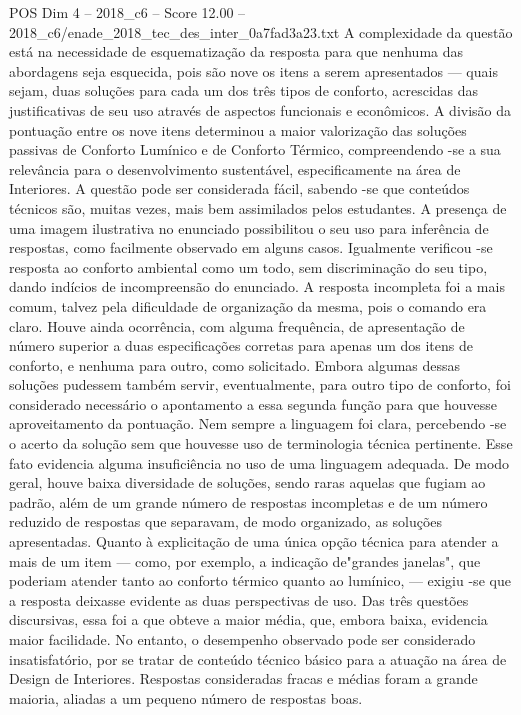 \begin{textsample}{POS Dim 4 – 2018\_c6 – Score 12.00 – 2018\_c6/enade\_2018\_tec\_des\_inter\_0a7fad3a23.txt}
A complexidade da questão está na necessidade de esquematização da resposta para que nenhuma das abordagens seja esquecida, pois são nove os itens a serem apresentados — quais sejam, duas soluções para cada um dos três tipos de conforto, acrescidas das justificativas de seu uso através de aspectos funcionais e econômicos.
A divisão da pontuação entre os nove itens determinou a maior valorização das soluções passivas de Conforto Lumínico e de Conforto Térmico, compreendendo -se a sua relevância para o desenvolvimento sustentável, especificamente na área de Interiores.
A questão pode ser considerada fácil, sabendo -se que conteúdos técnicos são, muitas vezes, mais bem assimilados pelos estudantes.
A presença de uma imagem ilustrativa no enunciado possibilitou o seu uso para inferência de respostas, como facilmente observado em alguns casos.
Igualmente verificou -se resposta ao conforto ambiental como um todo, sem discriminação do seu tipo, dando indícios de incompreensão do enunciado.
A resposta incompleta foi a mais comum, talvez pela dificuldade de organização da mesma, pois o comando era claro.
Houve ainda ocorrência, com alguma frequência, de apresentação de número superior a duas especificações corretas para apenas um dos itens de conforto, e nenhuma para outro, como solicitado.
Embora algumas dessas soluções pudessem também servir, eventualmente, para outro tipo de conforto, foi considerado necessário o apontamento a essa segunda função para que houvesse aproveitamento da pontuação.
Nem sempre a linguagem foi clara, percebendo -se o acerto da solução sem que houvesse uso de terminologia técnica pertinente.
Esse fato evidencia alguma insuficiência no uso de uma linguagem adequada.
De modo geral, houve baixa diversidade de soluções, sendo raras aquelas que fugiam ao padrão, além de um grande número de respostas incompletas e de um número reduzido de respostas que separavam, de modo organizado, as soluções apresentadas.
Quanto à explicitação de uma única opção técnica para atender a mais de um item — como, por exemplo, a indicação de"grandes janelas", que poderiam atender tanto ao conforto térmico quanto ao lumínico, — exigiu -se que a resposta deixasse evidente as duas perspectivas de uso.
Das três questões discursivas, essa foi a que obteve a maior média, que, embora baixa, evidencia maior facilidade.
No entanto, o desempenho observado pode ser considerado insatisfatório, por se tratar de conteúdo técnico básico para a atuação na área de Design de Interiores.
Respostas consideradas fracas e médias foram a grande maioria, aliadas a um pequeno número de respostas boas.

\end{textsample}

